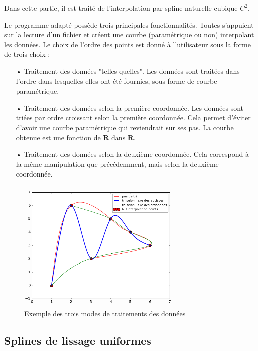 \documentclass[a4paper,12pt]{article} %
\begin{document}
Dans cette partie, il est traité de l'interpolation par spline naturelle cubique $C^{2}$.

Le programme adapté possède trois principales fonctionnalités. Toutes s'appuient sur la lecture d'un fichier et créent une courbe (paramétrique ou non) interpolant les données.
Le choix de l'ordre des points est donné à l'utilisateur sous la forme de trois choix : 


\begin{itemize}
    \item[•] Traitement des données "telles quelles". Les données sont traitées dans l'ordre dans lesquelles elles ont été fournies, sous forme de courbe paramétrique.
    \item[•] Traitement des données selon la première coordonnée. Les données sont triées par ordre croissant selon la première coordonnée. Cela permet d'éviter d'avoir une courbe paramétrique qui reviendrait sur ses pas. La courbe obtenue est une fonction de $\mathbf{R}$ dans $\mathbf{R}$.
    \item[•] Traitement des données selon la deuxième coordonnée. Cela correspond à la même manipulation que précédemment, mais selon la deuxième coordonnée.
\end{itemize}





\begin{figure}[h]
\begin{center}
\includegraphics[width=8cm]{tache0.png} 
\end{center}
\caption{Exemple des trois modes de traitements des données}
\end{figure}

\subsection{Splines de lissage uniformes}
\end{document}
